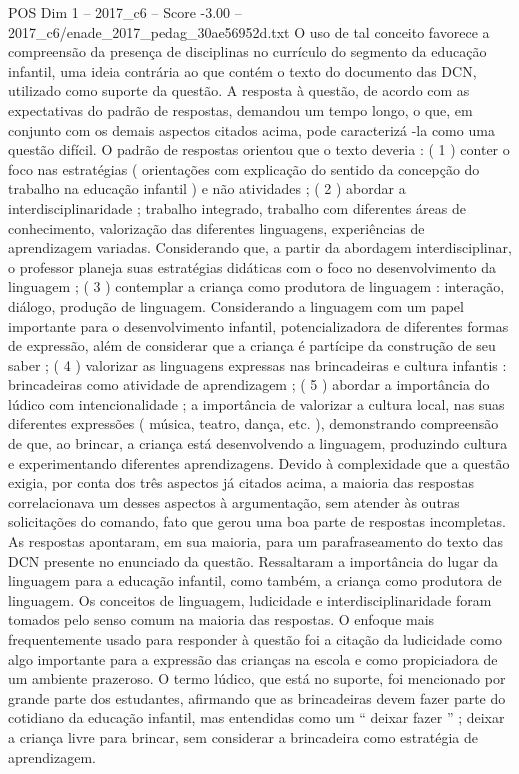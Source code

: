\begin{textsample}{POS Dim 1 – 2017\_c6 – Score -3.00 – 2017\_c6/enade\_2017\_pedag\_30ae56952d.txt}
O uso de tal conceito favorece a compreensão da presença de disciplinas no currículo do segmento da educação infantil, uma ideia contrária ao que contém o texto do documento das DCN, utilizado como suporte da questão.
A resposta à questão, de acordo com as expectativas do padrão de respostas, demandou um tempo longo, o que, em conjunto com os demais aspectos citados acima, pode caracterizá -la como uma questão difícil.
O padrão de respostas orientou que o texto deveria : ( 1 ) conter o foco nas estratégias ( orientações com explicação do sentido da concepção do trabalho na educação infantil ) e não atividades ; ( 2 ) abordar a interdisciplinaridade ; trabalho integrado, trabalho com diferentes áreas de conhecimento, valorização das diferentes linguagens, experiências de aprendizagem variadas.
Considerando que, a partir da abordagem interdisciplinar, o professor planeja suas estratégias didáticas com o foco no desenvolvimento da linguagem ; ( 3 ) contemplar a criança como produtora de linguagem : interação, diálogo, produção de linguagem.
Considerando a linguagem com um papel importante para o desenvolvimento infantil, potencializadora de diferentes formas de expressão, além de considerar que a criança é partícipe da construção de seu saber ; ( 4 ) valorizar as linguagens expressas nas brincadeiras e cultura infantis : brincadeiras como atividade de aprendizagem ; ( 5 ) abordar a importância do lúdico com intencionalidade ; a importância de valorizar a cultura local, nas suas diferentes expressões ( música, teatro, dança, etc. ), demonstrando compreensão de que, ao brincar, a criança está desenvolvendo a linguagem, produzindo cultura e experimentando diferentes aprendizagens.
Devido à complexidade que a questão exigia, por conta dos três aspectos já citados acima, a maioria das respostas correlacionava um desses aspectos à argumentação, sem atender às outras solicitações do comando, fato que gerou uma boa parte de respostas incompletas.
As respostas apontaram, em sua maioria, para um parafraseamento do texto das DCN presente no enunciado da questão.
Ressaltaram a importância do lugar da linguagem para a educação infantil, como também, a criança como produtora de linguagem.
Os conceitos de linguagem, ludicidade e interdisciplinaridade foram tomados pelo senso comum na maioria das respostas.
O enfoque mais frequentemente usado para responder à questão foi a citação da ludicidade como algo importante para a expressão das crianças na escola e como propiciadora de um ambiente prazeroso.
O termo lúdico, que está no suporte, foi mencionado por grande parte dos estudantes, afirmando que as brincadeiras devem fazer parte do cotidiano da educação infantil, mas entendidas como um “ deixar fazer ” ; deixar a criança livre para brincar, sem considerar a brincadeira como estratégia de aprendizagem.

\end{textsample}
